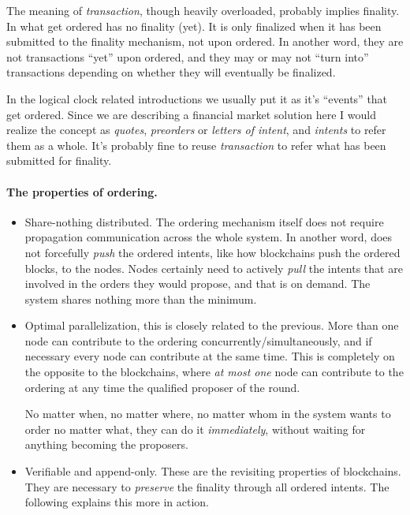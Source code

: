 The meaning of \emph{transaction}, though heavily overloaded, probably implies finality.
In \sys what get ordered has no finality (yet).
It is only finalized when it has been submitted to the finality mechanism, not upon ordered.
In another word, they are not transactions ``yet'' upon ordered, and they may or may not ``turn into'' transactions depending on whether they will eventually be finalized.

In the logical clock related introductions we usually put it as it's ``events'' that get ordered.
Since we are describing a financial market solution here I would realize the concept as \emph{quotes}, \emph{preorders} or \emph{letters of intent}, and \emph{intents} to refer them as a whole.
It's probably fine to reuse \emph{transaction} to refer what has been submitted for finality.


\paragraph{The properties of ordering.}
\begin{itemize}
    \item Share-nothing distributed.
    The ordering mechanism itself does not require propagation \ie communication across the whole system.
    In another word, \sys does not forcefully \emph{push} the ordered intents, like how blockchains push the ordered blocks, to the nodes.
    Nodes certainly need to actively \emph{pull} the intents that are involved in the orders they would propose, and that is on demand.
    The system shares nothing more than the minimum.
    
    \item Optimal parallelization, this is closely related to the previous.
    More than one node can contribute to the ordering concurrently/simultaneously, and if necessary every node can contribute at the same time.
    This is completely on the opposite to the blockchains, where \emph{at most one} node can contribute to the ordering at any time \ie the qualified proposer of the round.

    No matter when, no matter where, no matter whom in the \sys system wants to order no matter what, they can do it \emph{immediately}, without waiting for anything \eg becoming the proposers.
    
    \item Verifiable and append-only.
    These are the revisiting properties of blockchains.
    They are necessary to \emph{preserve} the finality through all ordered intents.
    The following explains this more in action.
\end{itemize}

